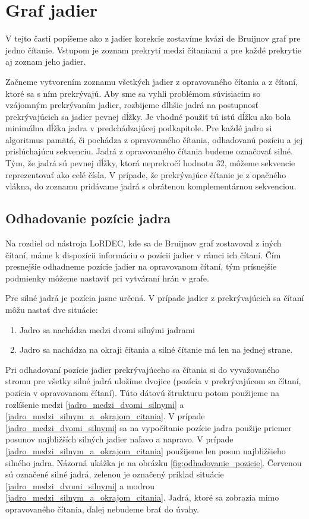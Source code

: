 \section{Graf jadier}

V tejto časti popíšeme ako z jadier korekcie zostavíme kvázi de Bruijnov graf pre jedno čítanie. Vstupom je zoznam prekrytí medzi čítaniami a pre každé prekrytie aj zoznam jeho jadier. 

Začneme vytvorením zoznamu všetkých jadier z opravovaného čítania a z čítaní, ktoré sa s ním prekrývajú. Aby sme sa vyhli problémom súvisiacim so vzájomným prekrývaním jadier, rozbijeme dlhšie jadrá na postupnosť prekrývajúcich sa jadier pevnej dĺžky. Je vhodné použiť tú istú dĺžku ako bola minimálna dĺžka jadra v predchádzajúcej podkapitole. Pre každé jadro si algoritmus pamätá, či pochádza z opravovaného čítania, odhadovanú pozíciu a jej prislúchajúcu sekvenciu. Jadrá z opravovaného čítania budeme označovať silné. Tým, že jadrá sú pevnej dĺžky, ktorá neprekročí hodnotu 32, môžeme sekvencie reprezentovať ako celé čísla. V prípade, že prekrývajúce čítanie je z opačného vlákna, do zoznamu pridávame jadrá s obrátenou komplementárnou sekvenciou.

\subsection{Odhadovanie pozície jadra}

Na rozdiel od nástroja LoRDEC, kde sa de Bruijnov graf zostavoval z iných čítaní, máme k dispozícii informáciu o pozícii jadier v rámci ich čítaní. Čím presnejšie odhadneme pozície jadier na opravovanom čítaní, tým prísnejšie podmienky môžeme nastaviť pri vytváraní hrán v grafe. 

Pre silné jadrá je pozícia jasne určená. V prípade jadier z prekrývajúcich sa čítaní môžu nastať dve situácie:

\begin{enumerate}[label={S.\arabic*}]
\item \label{jadro_medzi_dvomi_silnymi} Jadro sa nachádza medzi dvomi silnými jadrami
\item \label{jadro_medzi_silnym_a_okrajom_citania} Jadro sa nachádza na okraji čítania a silné čítanie má len na jednej strane.
\end{enumerate}

Pri odhadovaní pozície jadier prekrývajúceho sa čítania si do vyvažovaného stromu pre všetky silné jadrá uložíme dvojice (pozícia v prekrývajúcom sa čítaní, pozícia v opravovanom čítaní). Túto dátovú štrukturu potom použijeme na rozlíšenie medzi \ref{jadro_medzi_dvomi_silnymi} a \ref{jadro_medzi_silnym_a_okrajom_citania}. V prípade \ref{jadro_medzi_dvomi_silnymi} sa na vypočítanie pozície jadra použije priemer posunov najbližších silných jadier naľavo a napravo. V prípade \ref{jadro_medzi_silnym_a_okrajom_citania} použijeme len posun najbližšieho silného jadra. Názorná ukážka je na obrázku \ref{fig:odhadovanie_pozicie}. Červenou sú označené silné jadrá, zelenou je označený príklad situácie \ref{jadro_medzi_dvomi_silnymi} a modrou \ref{jadro_medzi_silnym_a_okrajom_citania}. Jadrá, ktoré sa zobrazia mimo opravovaného čítania, ďalej nebudeme brať do úvahy.

